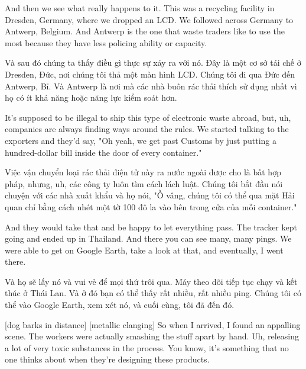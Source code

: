 \documentclass[a4paper]{article}
\begin{document}
	And then we see what really happens to it.
	This was a recycling facility in Dresden, Germany, where we dropped an LCD.
	We followed across Germany to Antwerp, Belgium.
	And Antwerp is the one that waste traders like to use the most because they have less policing ability or capacity.
	
	\begin{vietnamese-v2}
		Và sau đó chúng ta thấy điều gì thực sự xảy ra với nó.
		Đây là một cơ sở tái chế ở Dresden, Đức, nơi chúng tôi thả một màn hình LCD.
		Chúng tôi đi qua Đức đến Antwerp, Bỉ.
		Và Antwerp là nơi mà các nhà buôn rác thải thích sử dụng nhất vì họ có ít khả năng hoặc năng lực kiểm soát hơn.
	\end{vietnamese-v2}
	
	It's supposed to be illegal to ship this type of electronic waste abroad, but, uh, companies are always finding ways around the rules.
	We started talking to the exporters and they'd say, "Oh yeah, we get past Customs by just putting a hundred-dollar bill inside the door of every container."
	
	\begin{vietnamese-v2}
		Việc vận chuyển loại rác thải điện tử này ra nước ngoài được cho là bất hợp pháp, nhưng, uh, các công ty luôn tìm cách lách luật.
		Chúng tôi bắt đầu nói chuyện với các nhà xuất khẩu và họ nói, "Ồ vâng, chúng tôi có thể qua mặt Hải quan chỉ bằng cách nhét một tờ 100 đô la vào bên trong cửa của mỗi container."
	\end{vietnamese-v2}
	
	And they would take that and be happy to let everything pass.
	The tracker kept going and ended up in Thailand.
	And there you can see many, many pings.
	We were able to get on Google Earth, take a look at that, and eventually, I went there.
	
	\begin{vietnamese-v2}
		Và họ sẽ lấy nó và vui vẻ để mọi thứ trôi qua.
		Máy theo dõi tiếp tục chạy và kết thúc ở Thái Lan.
		Và ở đó bạn có thể thấy rất nhiều, rất nhiều ping.
		Chúng tôi có thể vào Google Earth, xem xét nó, và cuối cùng, tôi đã đến đó.
	\end{vietnamese-v2}
	
	[dog barks in distance]
	[metallic clanging]
	So when I arrived, I found an appalling scene.
	The workers were actually smashing the stuff apart by hand.
	Uh, releasing a lot of very toxic substances in the process.
	You know, it's something that no one thinks about when they're designing these products.
	
\end{document}
